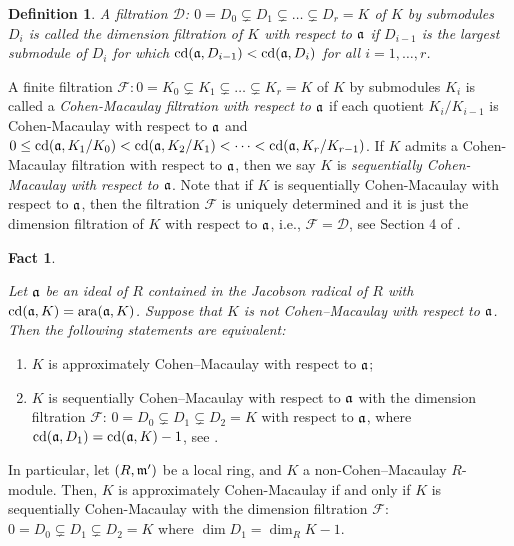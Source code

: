 \documentclass[10pt,a4paper]{amsart}
\numberwithin{equation}{theorem}
\theoremstyle{definition}
\newtheorem{definition}[theorem]{Definition}
\theoremstyle{fact}
\newtheorem{fact}[theorem]{Fact}
\theoremstyle{conjecture}
\newcommand{\ara}{\operatorname{ara}}
\newcommand{\cd}{\operatorname{cd}}
\newcommand{\fm}{\frak{m}}
\newcommand{\fa}{\frak{a}}
\begin{document}
\begin{definition}
\label{4.3} {\em A filtration $\mathscr{D}$: $0=D_0\varsubsetneq D_1\varsubsetneq \dots  \varsubsetneq  D_r=K$ of $K$ by submodules $D_i$ is called the
 {\em dimension filtration of $K$ with respect to $\fa$} if $D_{i-1}$ is the largest submodule of $D_i$ for which $\cd(\fa, D_{i-1})<\cd(\fa, D_i)$
for all $i=1, \dots, r$.}
\end{definition}
A finite filtration $\mathcal{F}: 0=K_0\varsubsetneq K_1 \varsubsetneq \dots  \varsubsetneq K_r=K$ of $K$ by submodules $K_i$ is called a
{\em Cohen-Macaulay filtration with respect to $\fa$} if each quotient $K_i/K_{i-1}$ is Cohen-Macaulay with respect to $\fa$ and
$0 \leq \cd(\fa, K_1/K_0)<\cd(\fa, K_2/K_1)< \dots< \cd(\fa, K_r/K_{r-1})$. If $K$ admits a Cohen-Macaulay filtration with respect to $\fa$,
then we say $K$ is \emph {sequentially Cohen-Macaulay with respect to $\fa$}. Note that if $K$ is sequentially Cohen-Macaulay with respect to $\fa$,
then the filtration $\mathscr{F}$ is uniquely determined and it is just the dimension filtration of $K$ with respect to $\fa$,
 i.e., $\mathscr{F}=\mathscr{D}$, see Section 4 of \cite{R4}.
\begin{fact}
\label{4.4}{\em
Let $\fa$ be an ideal of $R$ contained in the Jacobson radical of $R$ with $\cd(\fa, K) = \ara(\fa, K)$.
 Suppose that $K$ is not Cohen–Macaulay with respect to $\fa$. Then the following statements are equivalent:
\begin{enumerate}
\item [(a)] $K$ is approximately Cohen–Macaulay with respect to $\fa$;
\item [(b)] $K$ is sequentially Cohen–Macaulay with respect to $\fa$ with the dimension filtration $\mathcal{F}$:
$0 = D_0 \varsubsetneq D_1 \varsubsetneq D_2 = K$ with respect to $\fa$,
where $\cd(\fa, D_1) = \cd(\fa, K) - 1$, see \cite[Theorem 3.2]{FR}.
\end{enumerate}
In particular, let $(R, \fm')$ be a local ring, and $K$ a non-Cohen--Macaulay $R$-module.
  Then, $K$ is approximately Cohen-Macaulay if and only if
$K$ is sequentially Cohen-Macaulay  with the dimension filtration $\mathcal{F}$:
 $0=D_0\varsubsetneq D_1 \varsubsetneq D_2=K$ where $\dim D_1=\dim_RK-1$.
}
\end{fact}
\end{document}
